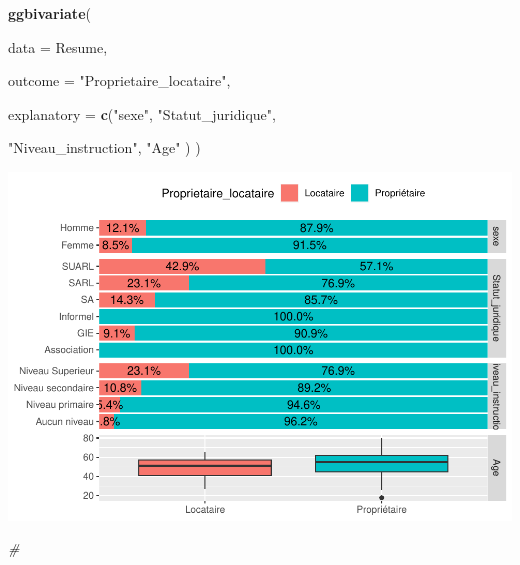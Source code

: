 \documentclass[
]{article}
\newenvironment{Shaded}{\begin{snugshade}}{\end{snugshade}}
\newcommand{\AttributeTok}[1]{\textcolor[rgb]{0.13,0.29,0.53}{#1}}
\newcommand{\CommentTok}[1]{\textcolor[rgb]{0.56,0.35,0.01}{\textit{#1}}}
\newcommand{\FunctionTok}[1]{\textcolor[rgb]{0.13,0.29,0.53}{\textbf{#1}}}
\newcommand{\NormalTok}[1]{#1}
\newcommand{\StringTok}[1]{\textcolor[rgb]{0.31,0.60,0.02}{#1}}
\begin{document}
\begin{Shaded}
\begin{Highlighting}[]
\FunctionTok{ggbivariate}\NormalTok{(}
  
  \AttributeTok{data =}\NormalTok{ Resume,}
            
            \AttributeTok{outcome =} \StringTok{"Proprietaire\_locataire"}\NormalTok{,}
            
            \AttributeTok{explanatory =} \FunctionTok{c}\NormalTok{(}\StringTok{"sexe"}\NormalTok{, }\StringTok{"Statut\_juridique"}\NormalTok{,}
                            
                            \StringTok{"Niveau\_instruction"}\NormalTok{, }\StringTok{"Age"}
\NormalTok{                            )}
\NormalTok{            )}
\end{Highlighting}
\end{Shaded}

\includegraphics{PROJET_files/figure-latex/unnamed-chunk-16-1.pdf}

\begin{Shaded}
\begin{Highlighting}[]
\CommentTok{\#}
\end{Highlighting}
\end{Shaded}

\newpage
\end{document}
